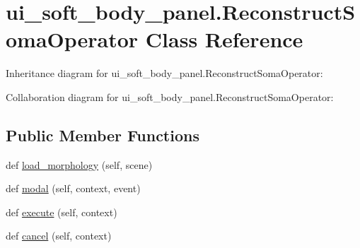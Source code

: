 \hypertarget{classui__soft__body__panel_1_1ReconstructSomaOperator}{}\section{ui\+\_\+soft\+\_\+body\+\_\+panel.\+Reconstruct\+Soma\+Operator Class Reference}
\label{classui__soft__body__panel_1_1ReconstructSomaOperator}


Inheritance diagram for ui\+\_\+soft\+\_\+body\+\_\+panel.\+Reconstruct\+Soma\+Operator\+:


Collaboration diagram for ui\+\_\+soft\+\_\+body\+\_\+panel.\+Reconstruct\+Soma\+Operator\+:
\subsection*{Public Member Functions}
\begin{DoxyCompactItemize}
\item 
def \hyperlink{classui__soft__body__panel_1_1ReconstructSomaOperator_a09afaf1fb2d16943f4e53209856a51ae}{load\+\_\+morphology} (self, scene)
\item 
def \hyperlink{classui__soft__body__panel_1_1ReconstructSomaOperator_a6c9737a08741af94ac04a48d75ed20f8}{modal} (self, context, event)
\item 
def \hyperlink{classui__soft__body__panel_1_1ReconstructSomaOperator_acf59f2e90f6d20b9ab1c1f8388416250}{execute} (self, context)
\item 
def \hyperlink{classui__soft__body__panel_1_1ReconstructSomaOperator_a1b6b35a3747b1d2d43fba43303888d5b}{cancel} (self, context)
\end{DoxyCompactItemize}
